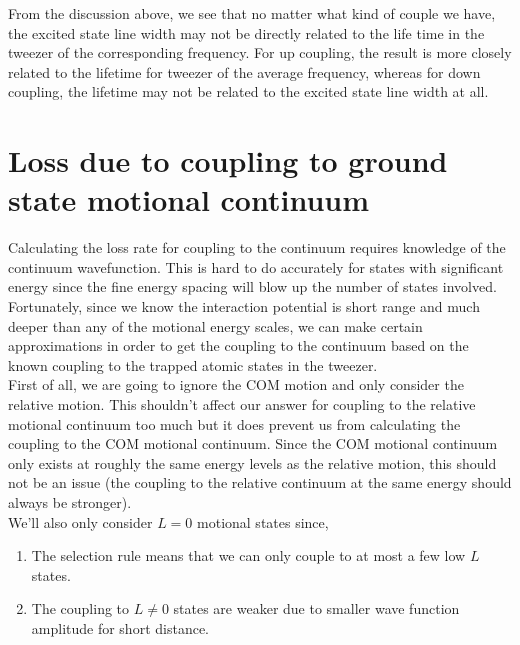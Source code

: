 \documentclass[10pt,fleqn]{article}
\begin{document}
From the discussion above, we see that no matter what kind of couple we have,
the excited state line width may not be directly related to the life time in the tweezer
of the corresponding frequency. For up coupling, the result is more closely related
to the lifetime for tweezer of the average frequency, whereas for down coupling,
the lifetime may not be related to the excited state line width at all.

\section{Loss due to coupling to ground state motional continuum}

Calculating the loss rate for coupling to the continuum requires knowledge of the
continuum wavefunction. This is hard to do accurately for states with significant
energy since the fine energy spacing will blow up the number of states involved.
Fortunately, since we know the interaction potential is short range and much deeper
than any of the motional energy scales, we can make certain approximations in order
to get the coupling to the continuum based on the known coupling to the trapped atomic
states in the tweezer.\\

First of all, we are going to ignore the COM motion and only consider the relative motion.
This shouldn't affect our answer for coupling to the relative motional continuum too much
but it does prevent us from calculating the coupling to the COM motional continuum.
Since the COM motional continuum only exists at roughly the same energy levels as the
relative motion, this should not be an issue (the coupling to the relative continuum
at the same energy should always be stronger).\\

We'll also only consider $L=0$ motional states since,
\begin{enumerate}
\item The selection rule means that we can only couple to at most a few low $L$ states.
\item The coupling to $L\neq0$ states are weaker due to smaller wave function amplitude
  for short distance.
\end{enumerate}
\end{document}
